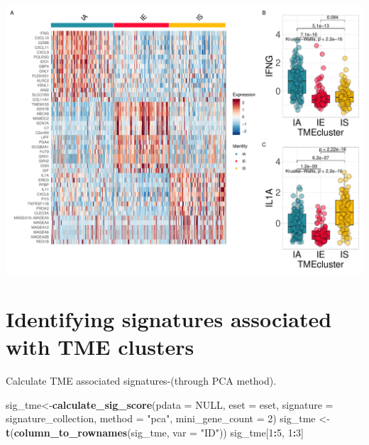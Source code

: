 \documentclass[
  12pt,
]{book}
\newenvironment{Shaded}{\begin{snugshade}}{\end{snugshade}}
\newcommand{\AttributeTok}[1]{\textcolor[rgb]{0.13,0.29,0.53}{#1}}
\newcommand{\ConstantTok}[1]{\textcolor[rgb]{0.56,0.35,0.01}{#1}}
\newcommand{\DecValTok}[1]{\textcolor[rgb]{0.00,0.00,0.81}{#1}}
\newcommand{\FunctionTok}[1]{\textcolor[rgb]{0.13,0.29,0.53}{\textbf{#1}}}
\newcommand{\NormalTok}[1]{#1}
\newcommand{\OtherTok}[1]{\textcolor[rgb]{0.56,0.35,0.01}{#1}}
\newcommand{\SpecialCharTok}[1]{\textcolor[rgb]{0.81,0.36,0.00}{\textbf{#1}}}
\newcommand{\StringTok}[1]{\textcolor[rgb]{0.31,0.60,0.02}{#1}}
\theoremstyle{definition}
\theoremstyle{definition}
\theoremstyle{definition}
\theoremstyle{definition}
\theoremstyle{remark}
\begin{document}
\includegraphics{_main_files/figure-latex/unnamed-chunk-20-1.pdf}

\hypertarget{identifying-signatures-associated-with-tme-clusters}{%
\section{Identifying signatures associated with TME clusters}\label{identifying-signatures-associated-with-tme-clusters}}

Calculate TME associated signatures-(through PCA method).

\begin{Shaded}
\begin{Highlighting}[]
\NormalTok{sig\_tme}\OtherTok{\textless{}{-}}\FunctionTok{calculate\_sig\_score}\NormalTok{(}\AttributeTok{pdata           =} \ConstantTok{NULL}\NormalTok{,}
                             \AttributeTok{eset            =}\NormalTok{ eset,}
                             \AttributeTok{signature       =}\NormalTok{ signature\_collection,}
                             \AttributeTok{method          =} \StringTok{"pca"}\NormalTok{,}
                             \AttributeTok{mini\_gene\_count =} \DecValTok{2}\NormalTok{)}
\NormalTok{sig\_tme }\OtherTok{\textless{}{-}} \FunctionTok{t}\NormalTok{(}\FunctionTok{column\_to\_rownames}\NormalTok{(sig\_tme, }\AttributeTok{var =} \StringTok{"ID"}\NormalTok{))}
\NormalTok{sig\_tme[}\DecValTok{1}\SpecialCharTok{:}\DecValTok{5}\NormalTok{, }\DecValTok{1}\SpecialCharTok{:}\DecValTok{3}\NormalTok{]}
\end{Highlighting}
\end{Shaded}
\end{document}
